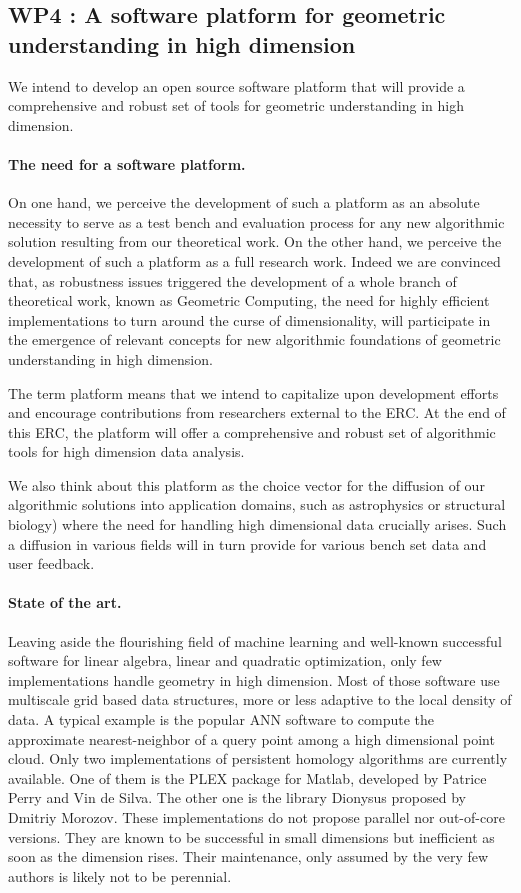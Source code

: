 
\subsection*{WP4 : A software platform for geometric understanding in high
  dimension}

We intend to develop an open source  software platform that will provide a
comprehensive and robust set of tools for geometric understanding in
high
dimension. 

\paragraph{ The need for a software platform.}
On one hand, we perceive the development of such a platform as 
an absolute necessity to serve as a test bench and  evaluation process
for any new algorithmic solution resulting  from  our theoretical work.
On the other hand, we perceive the development of such a platform as
a full research work. Indeed we are convinced that, as robustness
issues triggered the development of a whole branch of theoretical
work, known as Geometric Computing, the need for
highly efficient implementations to turn around the curse of  
dimensionality,  will participate in the emergence of relevant
concepts for new algorithmic foundations
of  geometric understanding in high dimension.


The term platform means that we intend to capitalize
upon development efforts and encourage contributions
from researchers external to the ERC.
 At the end of this ERC,
the platform will offer 
a comprehensive and robust set of algorithmic tools
for high dimension data analysis.

We also think about this platform as the choice
vector for the diffusion of our algorithmic solutions 
into application domains, such as astrophysics
or structural biology) 
 where the need for handling high dimensional
data crucially arises.  Such a diffusion in various fields
 will in turn provide for various bench set data 
and user feedback.



\paragraph{ State of the art.}  
Leaving aside the flourishing field of machine learning
and well-known successful software for linear algebra,
linear and quadratic optimization,  only  few implementations handle
geometry in high dimension. 
Most of those software use multiscale  grid based
data structures,  more or less adaptive
 to the local  density of data.
A typical example is the popular ANN software to compute  the approximate
nearest-neighbor of a query point
among a  high dimensional point cloud. 
Only two implementations of persistent homology algorithms are
currently available. One of them is the PLEX package for Matlab,
developed by Patrice Perry and Vin de Silva. The other one is the
library Dionysus proposed by Dmitriy Morozov. These implementations
do not propose parallel nor out-of-core versions. They are known to be
successful in small dimensions but inefficient as soon as the
dimension rises.  Their  maintenance, only assumed by the very few authors
is likely not to be perennial.

